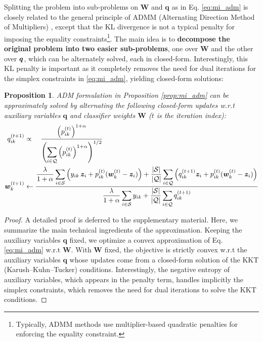 \documentclass{article}
\newtheorem{prop}{Proposition}
\begin{document}
    		    Splitting the problem into sub-problems on $\mathbf{W}$ and $\textbf{q}$ as in Eq. \eqref{eq:mi_adm} is closely related to the general principle of ADMM (Alternating Direction Method of Multipliers) \cite{boyd}, except that the KL divergence is not a typical penalty for imposing the equality constraints\footnote{Typically, ADMM methods use multiplier-based quadratic penalties for enforcing the equality constraint.}.    		  The main idea is to \textbf{decompose the original problem into two easier sub-problems}, one over $\mathbf{W}$ and the other over $\bm{q}$, which can be alternately solved, each in closed-form. Interestingly, this KL penalty is important as it completely removes the need for dual iterations for the simplex constraints in \eqref{eq:mi_adm}, yielding closed-form solutions:
    		    


    		    \begin{prop}\label{prop:mi_adm_solution}
    		        ADM formulation in Proposition \ref{prop:mi_adm} can be approximately solved by alternating the following closed-form updates w.r.t auxiliary variables $\textbf{q}$ and classifier weights $\mathbf{W}$ ($t$ is the iteration index):
    		        \begin{align}
q_{ik}^{(t+1)} &\propto \quad \displaystyle \frac{ \left ( p_{ik}^{(t)} \right )^{1+\alpha}}{\displaystyle \left ( \sum_{i \in \mathcal{Q}} \left ( p_{ik}^{(t)} \right )^{1+\alpha} \right )^{1/2}}  \\
    		          \bm{w}_k^{(t+1)} &\leftarrow \frac{\displaystyle\frac{\lambda}{1+\alpha} \displaystyle\sum\limits_{i \in \mathcal{S}} \left ( y_{ik} \,\bm{z}_i + p_{ik}^{(t)} (\bm{w}_k^{(t)} - \bm{z}_i) \right ) +  \frac{|\mathcal{S}|}{|\mathcal{Q}|} \displaystyle\sum\limits_{i \in \mathcal{Q}} \left ( q_{ik}^{(t+1)} \bm{z}_i + p_{ik}^{(t)} (\bm{w}_k^{(t)} - \bm{z}_i) \right )}{\displaystyle\frac{\lambda}{1+\alpha} \displaystyle\sum\limits_{i \in \mathcal{S}} y_{ik} +  \frac{|\mathcal{S}|}{|\mathcal{Q}|} \sum\limits_{i \in \mathcal{Q}} q_{ik}^{(t+1)}}
    		        \end{align}
    		    \end{prop}
    		    \begin{proof}
    		    A detailed proof is deferred to the supplementary material. Here, we summarize the main technical ingredients of the approximation. Keeping the auxiliary variables $\textbf{q}$ fixed, we optimize
    		    a convex approximation of Eq. \eqref{eq:mi_adm} w.r.t $\mathbf{W}$. With $\mathbf{W}$ fixed, the objective is strictly convex w.r.t the auxiliary variables $\textbf{q}$ whose updates come from a closed-form solution of the KKT (Karush–Kuhn–Tucker) conditions. Interestingly, the negative entropy of auxiliary variables, which appears in the penalty term, handles implicitly the simplex constraints, which removes the need for dual iterations to solve the KKT conditions.
    		    \end{proof}
\end{document}
